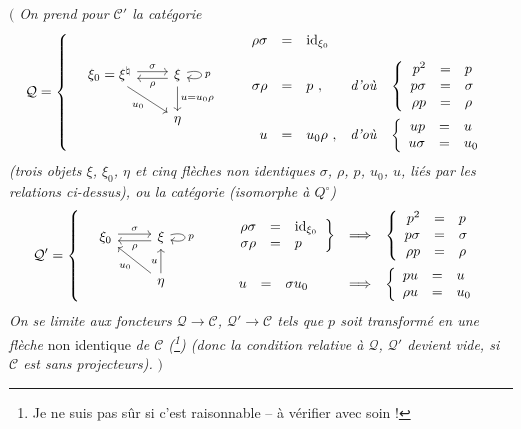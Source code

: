 $\Big($ \textit{On prend pour $\mathcal{C}'$ la catégorie}
\[
\mathcal{Q} = \left\{ \quad
\begin{tikzcd}[column sep=2.2em]
\xi_0 = \xi^\natural \arrow[r, shift left, "\sigma"] \arrow[dr, "u_0"'] & \xi \arrow[l, shift left, "\rho"] \arrow[d, "u = u_0\rho"] \arrow[loop right, "p"] \\
 & \eta
\end{tikzcd}
\qquad
\begin{array}{rclll}
\rho\sigma & = & \mathrm{id}_{\xi_0} & & \\[2ex]
\sigma\rho & = & p\ , & \text{\textit{d'où}} & \left\{\begin{array}{rcl} p^2 & = & p \\ p\sigma & = & \sigma \\ \rho p & = & \rho \end{array}\right. \\[4ex]
u & = & u_0\rho\ , & \text{\textit{d'où}} & \left\{\begin{array}{rcl} up & = & u \\ u\sigma & = & u_0 \end{array}\right.
\end{array}
\right.
\]
\textit{(trois objets $\xi$, $\xi_0$, $\eta$ et cinq flèches non identiques $\sigma$, $\rho$, $p$, $u_0$, $u$, liés par les relations ci-dessus), ou la catégorie (isomorphe à $Q^\circ$)} %
\[
\mathcal{Q}' = \left\{ \quad
\begin{tikzcd}
\xi_0 \arrow[r, shift left, "\sigma"] & \xi \arrow[l, shift left, "\rho"] \arrow[loop right, "p"] \\
 & \eta \arrow[ul, "u_0"] \arrow[u, "u"]
\end{tikzcd}
\qquad
\begin{array}{lcl}
\left.\begin{array}{rcl} \rho\sigma & = & \mathrm{id}_{\xi_0} \\ \sigma\rho & = & p \end{array}\right\} & \Longrightarrow & \left\{\begin{array}{rcl} p^2 & = & p \\ p\sigma & = & \sigma \\ \rho p & = & \rho \end{array}\right. \\[4ex]
\begin{array}{rcl} u & = & \sigma u_0 \end{array} & \Longrightarrow & \left\{\begin{array}{rcl} pu & = & u \\ \rho u & = & u_0 \end{array}\right.
\end{array}
\right.
\]
\textit{On se limite aux foncteurs $\mathcal{Q} \longrightarrow \mathcal{C}$, $\mathcal{Q}' \longrightarrow \mathcal{C}$ tels que $p$ soit transformé en une flèche} non identique \textit{de $\mathcal{C}$ (\footnote[195]{Je ne suis pas sûr si c'est raisonnable -- à vérifier avec soin !}) (donc la condition relative à $\mathcal{Q}$, $\mathcal{Q}'$ devient vide, si $\mathcal{C}$ est sans projecteurs).} $\Big)$

